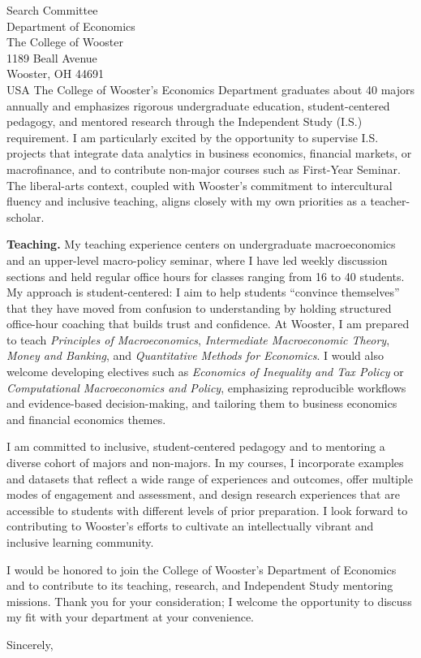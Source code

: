 \documentclass[11pt,letterpaper]{letter}
\begin{document}
\begin{letter}{Search Committee \\
Department of Economics \\
The College of Wooster \\
1189 Beall Avenue \\
Wooster, OH 44691 \\ USA}
The College of Wooster’s Economics Department graduates about 40 majors annually and emphasizes rigorous undergraduate education, student-centered pedagogy, and mentored research through the Independent Study (I.S.) requirement. I am particularly excited by the opportunity to supervise I.S. projects that integrate data analytics in business economics, financial markets, or macrofinance, and to contribute non-major courses such as First-Year Seminar. The liberal-arts context, coupled with Wooster’s commitment to intercultural fluency and inclusive teaching, aligns closely with my own priorities as a teacher-scholar.

\textbf{Teaching.} My teaching experience centers on undergraduate macroeconomics and an upper-level macro-policy seminar, where I have led weekly discussion sections and held regular office hours for classes ranging from 16 to 40 students. My approach is student-centered: I aim to help students “convince themselves” that they have moved from confusion to understanding by holding structured office-hour coaching that builds trust and confidence. At Wooster, I am prepared to teach \textit{Principles of Macroeconomics}, \textit{Intermediate Macroeconomic Theory}, \textit{Money and Banking}, and \textit{Quantitative Methods for Economics}. I would also welcome developing electives such as \textit{Economics of Inequality and Tax Policy} or \textit{Computational Macroeconomics and Policy}, emphasizing reproducible workflows and evidence-based decision-making, and tailoring them to business economics and financial economics themes.

I am committed to inclusive, student-centered pedagogy and to mentoring a diverse cohort of majors and non-majors. In my courses, I incorporate examples and datasets that reflect a wide range of experiences and outcomes, offer multiple modes of engagement and assessment, and design research experiences that are accessible to students with different levels of prior preparation. I look forward to contributing to Wooster’s efforts to cultivate an intellectually vibrant and inclusive learning community.

I would be honored to join the College of Wooster’s Department of Economics and to contribute to its teaching, research, and Independent Study mentoring missions. Thank you for your consideration; I welcome the opportunity to discuss my fit with your department at your convenience.

\closing{Sincerely,}

\end{letter}
\end{document}
